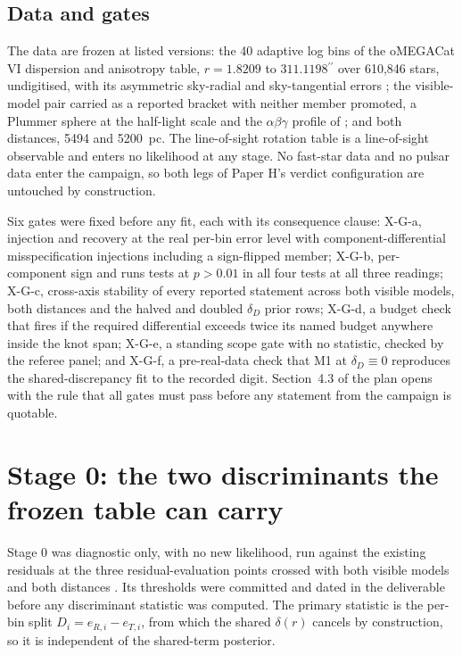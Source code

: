 \documentclass[11pt]{article}
\newcommand{\as}{\ensuremath{^{\prime\prime}}}
\newcommand{\dD}{\ensuremath{\delta_D}}
\begin{document}
\subsection{Data and gates}
\label{sec:data-gates}

The data are frozen at listed versions: the 40 adaptive log bins of the oMEGACat VI dispersion and anisotropy table, $r = 1.8209$ to $311.1198\as$ over 610{,}846 stars, undigitised, with its asymmetric sky-radial and sky-tangential errors \citep{Haberle2025oMEGACatVI}; the visible-model pair carried as a reported bracket with neither member promoted, a Plummer sphere at the \citet{BaumgardtHilker2018} half-light scale and the $\alpha\beta\gamma$ profile of \citet{BanaresHernandez2025}; and both distances, 5494 and 5200~pc. The line-of-sight rotation table \citep{Haberle2026LVM} is a line-of-sight observable and enters no likelihood at any stage. No fast-star data and no pulsar data enter the campaign, so both legs of Paper H's verdict configuration are untouched by construction.

Six gates were fixed before any fit, each with its consequence clause: X-G-a, injection and recovery at the real per-bin error level with component-differential misspecification injections including a sign-flipped member; X-G-b, per-component sign and runs tests at $p > 0.01$ in all four tests at all three readings; X-G-c, cross-axis stability of every reported statement across both visible models, both distances and the halved and doubled \dD{} prior rows; X-G-d, a budget check that fires if the required differential exceeds twice its named budget anywhere inside the knot span; X-G-e, a standing scope gate with no statistic, checked by the referee panel; and X-G-f, a pre-real-data check that M1 at $\dD \equiv 0$ reproduces the shared-discrepancy fit to the recorded digit. Section~4.3 of the plan opens with the rule that all gates must pass before any statement from the campaign is quotable.

\section{Stage 0: the two discriminants the frozen table can carry}
\label{sec:stage0}

Stage 0 was diagnostic only, with no new likelihood, run against the existing residuals at the three residual-evaluation points crossed with both visible models and both distances \citep{AXIStage0Report2026}. Its thresholds were committed and dated in the deliverable before any discriminant statistic was computed. The primary statistic is the per-bin split $D_i = e_{R,i} - e_{T,i}$, from which the shared $\delta(r)$ cancels by construction, so it is independent of the shared-term posterior.
\end{document}
